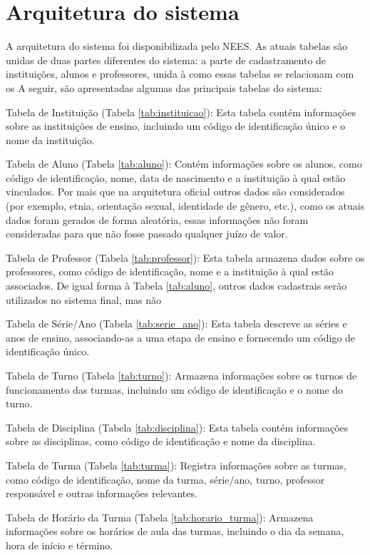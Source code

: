 \chapter{Arquitetura do sistema}

A arquitetura do sistema foi disponibilizada pelo NEES. As atuais tabelas são unidas de duas partes diferentes do sistema: a parte de cadastramento de instituições, alunos e professores, unida à como essas tabelas se relacionam com os  A seguir, são apresentadas algumas das principais tabelas do sistema:

Tabela de Instituição (Tabela \ref{tab:instituicao}): Esta tabela contém informações sobre as instituições de ensino, incluindo um código de identificação único e o nome da instituição.

Tabela de Aluno (Tabela \ref{tab:aluno}): Contém informações sobre os alunos, como código de identificação, nome, data de nascimento e a instituição à qual estão vinculados.  Por mais que na arquitetura oficial outros dados são considerados (por exemplo, etnia, orientação sexual, identidade de gênero, etc.), como os atuais dados foram gerados de forma aleatória, essas informações não foram consideradas para que não fosse passado qualquer juízo de valor.

Tabela de Professor (Tabela \ref{tab:professor}): Esta tabela armazena dados sobre os professores, como código de identificação, nome e a instituição à qual estão associados. De igual forma à Tabela \ref{tab:aluno}, outros dados cadastrais serão utilizados no sistema final, mas não  

Tabela de Série/Ano (Tabela \ref{tab:serie_ano}): Esta tabela descreve as séries e anos de ensino, associando-as a uma etapa de ensino e fornecendo um código de identificação único.

Tabela de Turno (Tabela \ref{tab:turno}): Armazena informações sobre os turnos de funcionamento das turmas, incluindo um código de identificação e o nome do turno.

Tabela de Disciplina (Tabela \ref{tab:disciplina}): Esta tabela contém informações sobre as disciplinas, como código de identificação e nome da disciplina.

Tabela de Turma (Tabela \ref{tab:turma}): Registra informações sobre as turmas, como código de identificação, nome da turma, série/ano, turno, professor responsável e outras informações relevantes.

Tabela de Horário da Turma (Tabela \ref{tab:horario_turma}): Armazena informações sobre os horários de aula das turmas, incluindo o dia da semana, hora de início e término.

